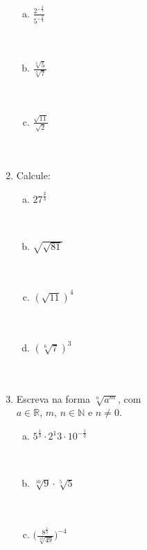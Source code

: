 \documentclass[a4paper,14pt]{article}
\begin{document}
\begin{multicols}{2}
\begin{enumerate}
\begin{enumerate}[a)]
        	\item $\frac{2^{-\frac{2}{9}}}{5^{-\frac{2}{9}}}$\\\\\\
        	\item $\frac{\sqrt[3]{5}}{\sqrt[3]{7}}$\\\\\\
        	\item $\frac{\sqrt{11}}{\sqrt{2}}$\\\\\\
        \end{enumerate}
        \item Calcule:
        \begin{enumerate}[a)]
        	\item $27^\frac{2}{3}$\\\\\\
        	\item $\sqrt{\sqrt{81}}$\\\\\\
        	\item $(\sqrt{11})^4$\\\\\\
        	\item $(\sqrt[6]{7})^3$\\\\\\
        \end{enumerate}
        \item Escreva na forma $\sqrt[n]{a^m}$, com \\$a \in \mathbb{R}$, $m$, $n \in \mathbb{N}$ e $n \neq 0$.
        \begin{enumerate}[a)]
        	\item $5^\frac{1}{3} \cdot 2^{1}{3} \cdot 10^{-\frac{1}{3}}$\\\\\\
        	\item $\sqrt[10]{9} \cdot \sqrt[5]{5}$\\\\\\
        	\item $\bigg( \frac{8^\frac{1}{6}}{\sqrt[12]{49}} \bigg)^{-4}$\\\\\\

\end{enumerate}
\end{enumerate}
\end{multicols}
\end{document}
